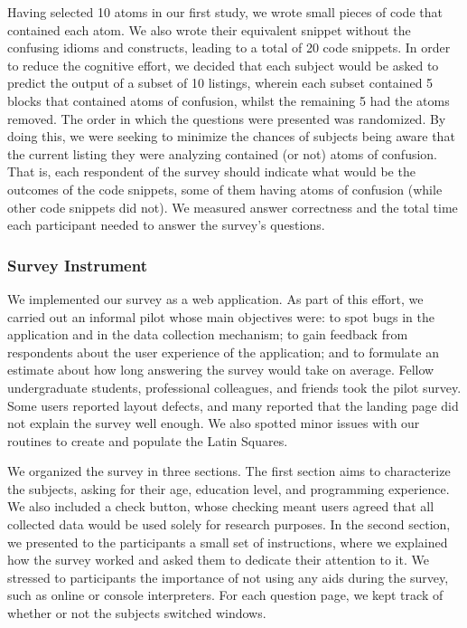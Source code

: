 Having selected 10 atoms in our first study, we wrote small pieces of code that contained each atom. We also wrote their equivalent snippet without the confusing idioms and constructs, leading to a total of 20 code snippets. In order to reduce the cognitive effort, we decided that each subject would be asked to predict the output of a subset of 10 listings, wherein each subset contained 5 blocks that contained atoms of confusion, whilst the remaining 5 had the atoms removed. The order in which the questions were presented was randomized. By doing this, we were seeking to minimize the chances of subjects being aware that the current listing they were analyzing contained (or not) atoms of confusion.
That is, each respondent of the survey should indicate what would be the outcomes of the code snippets, some of them having atoms of confusion (while other code snippets did not). 
We measured answer correctness and the total time each participant needed to answer the survey's questions.

\subsubsection{Survey Instrument} 

We implemented our survey as a web application. As part of this 
effort, we carried out an informal pilot whose main objectives were: to spot bugs in the application and in the data collection mechanism; to gain feedback from respondents about the user experience of the application; and to formulate an estimate about how long answering the survey would take on average. Fellow undergraduate students, professional colleagues, and friends took the pilot survey. Some users reported layout defects, and many reported that the landing page did not explain the survey well enough. We also spotted minor issues with our routines to create and populate the Latin Squares. 

We organized the survey in {\color{red}three} sections. The first section aims to characterize the subjects, asking for their age, education level, and programming experience. We also included a check button, whose checking meant users agreed that all collected data would be used solely for research purposes. In the second section, we presented to the participants a small set of instructions, where we explained how the survey worked and asked them to dedicate their attention to it. We stressed to participants the importance of not using any aids during the survey, such as online or console interpreters. For each question page, we kept track of whether or not the subjects switched windows. 

